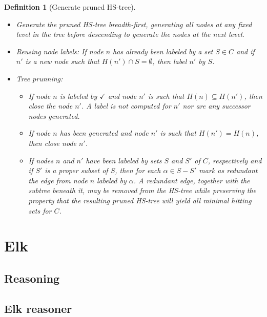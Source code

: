 \documentclass[12pt,a4paper]{article}
\newtheorem{definition}{Definition}[subsection]
\begin{document}
\begin{definition}[Generate pruned HS-tree]{\indent}
	\begin{itemize}
		\item Generate the pruned HS-tree breadth-first, generating all nodes at any fixed level in the tree before descending to generate the nodes at the next level.
		
		\item Reusing node labels: If node $n$ has already been labeled by a set $S \in C$ and if $n'$ is a new node such that $H(n') \cap S = \emptyset$, then label $n'$ by $S$.
		
		\item Tree prunning:
		
		\begin{itemize}
			\item If node $n$ is labeled by $\checkmark$ and node $n'$ is such that $H(n) \subseteq H(n')$, then close the node $n'$. A label is not computed for $n'$ nor are any successor nodes generated.
			
			\item If node $n$ has been generated and node $n'$ is such that $H(n') = H(n)$, then close node $n'$.
			
			\item If nodes $n$ and $n'$ have been labeled by sets $S$ and $S'$ of $C$, respectively and if $S'$ is a proper subset of $S$, then for each $\alpha \in S - S'$ mark as redundant the edge from node $n$ labeled by $\alpha$. A redundant edge, together with the subtree beneath it, may be removed from the HS-tree while preserving the property that the resulting pruned HS-tree will yield all minimal hitting sets for $C$.
			
		\end{itemize}	
		
	\end{itemize}
	
\end{definition}

\section{Elk}

\subsection{Reasoning}

\subsection{Elk reasoner}
\end{document}

